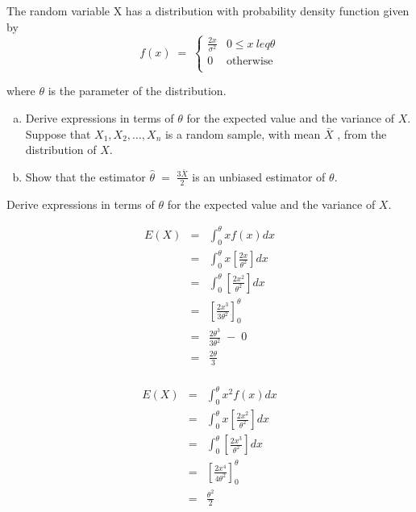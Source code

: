 \documentclass[a4paper,12pt]{article}
\begin{document}
\large
The random variable X has a distribution with probability density function given by
\[  f(x) \;=\; \begin{cases} 
\frac{2x}{\sigma^2}  & 0 \leq x \ leq \theta \\
0  & \mbox{otherwise} \\
\end{cases}\]


where $\theta$ is the parameter of the distribution.
\begin{enumerate}[(a)]
\item 
Derive expressions in terms of $\theta$ for the expected value and the variance of $X$.\\
\bigskip
\noindent Suppose that $X_1 , X_2 , \ldots , X_n$ is a random sample, with mean $\bar{X}$ , from the distribution
of $X$.
\item  Show that the estimator $ {  \displaystyle \hat{\theta}  \;=\; \frac{3\bar{X}}{2} }$ is an unbiased estimator of $\theta$.

\end{enumerate}

\newpage
\begin{framed} \large
\noindent Derive expressions in terms of $\theta$ for the expected value and the variance of $X$.
\end{framed}


\begin{eqnarray*}
E ( X ) &=& \int^{\theta}_{0} x f(x) dx \\
&=& \int^{\theta}_{0} x \left[ \frac{2x}{\theta^2} \right] dx\\
&=& \int^{\theta}_{0}  \left[ \frac{2x^2}{\theta^2} \right] dx\\
&=& \left[ \frac{2x^3}{3\theta^2} \right]^{\theta}_{0} \\
&=& \frac{2\theta^3}{3\theta^2} \;-\;0 \\
&=& \frac{2 \theta}{3} \\
\end{eqnarray*}


\begin{eqnarray*}
E ( X ) &=& \int^{\theta}_{0} x^2 f(x) dx \\
&=& \int^{\theta}_{0} x \left[ \frac{2x^2}{\theta^2} \right] dx\\
&=& \int^{\theta}_{0} \left[ \frac{2x^3}{\theta^2} \right] dx \\
&=& \left[ \frac{2x^4}{4\theta^2} \right]^{\theta}_{0} \\
&=& \frac{ \theta^2}{2} \\
\end{eqnarray*}
\end{document}
